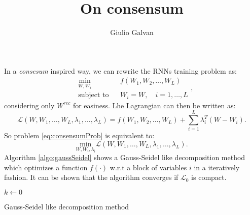 \documentclass{article}
\title{On consensum}
\author{Giulio Galvan}
\begin{document}
	\maketitle
	
\noindent	
In a \textit{consesum} inspired way, we can rewrite the RNNs training problem as:
\begin{equation}
	\begin{aligned}
		& \underset{W,W_i}{\text{min}}
		& & f(W_1,W_2, \ldots, W_L) \\
		& \text{subject to}
		& & W_i = W,\quad i=1,\ldots,L
	\end{aligned},
	\label{eq:consensumProb}
\end{equation}
considering only $W^{rec}$ for easiness. 
Lhe Lagrangian can then be written as:
\begin{equation}
\mathcal{L}(W,W_1,\ldots, W_L, \lambda_1,\ldots, \lambda_L) = f(W_1,W_2,\ldots,W_L) + \sum_{i=1}^{L}\lambda_i^T (W-W_i).
\end{equation}
So problem \ref{eq:consensumProb} is equivalent to:
\begin{equation}
\underset{W,W_i,\lambda_i}{\text{min}}\mathcal{L}(W,W_1,\ldots, W_L, \lambda_1,\ldots, \lambda_L).
\label{eq:lagrangianConsensum}
\end{equation}
Algorithm \ref{algo:gaussSeidel} shows a Gauss-Seidel like decomposition method which optimizes a function $f(\cdot)$ w.r.t a block of variables $i$ in a iteratively fashion. It can be shown that the algorithm converges if $\mathcal{L}_0$ is compact.

\begin{algorithm}[!h]
	$k \gets 0$\\
	\caption{Gauss-Seidel like decomposition method}
	\label{algo:gaussSeidel}
\end{algorithm}
\end{document}
